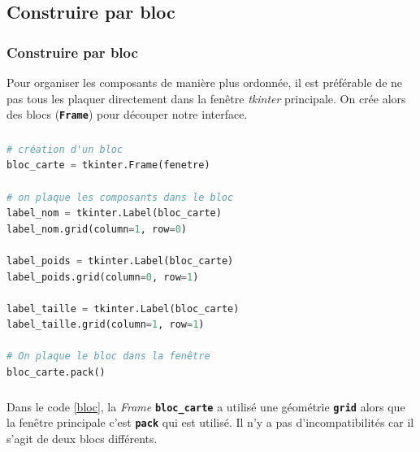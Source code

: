 \documentclass[svgnames,11pt]{beamer}
\begin{document}
\subsection{Construire par bloc}
\begin{frame}
    \frametitle{Construire par bloc}

    Pour organiser les composants de manière plus ordonnée, il est préférable de ne pas tous les plaquer directement dans la fenêtre \emph{tkinter} principale. On crée alors des blocs (\textbf{\texttt{Frame}}) pour découper notre interface.


\end{frame}
\begin{frame}[fragile]
    \frametitle{}

    \begin{center}
        \begin{lstlisting}[language=Python, basicstyle=\small]
# création d'un bloc
bloc_carte = tkinter.Frame(fenetre)

# on plaque les composants dans le bloc
label_nom = tkinter.Label(bloc_carte)
label_nom.grid(column=1, row=0)

label_poids = tkinter.Label(bloc_carte)
label_poids.grid(column=0, row=1)

label_taille = tkinter.Label(bloc_carte)
label_taille.grid(column=1, row=1)

# On plaque le bloc dans la fenêtre
bloc_carte.pack()
\end{lstlisting}
        \label{bloc}
    \end{center}

\end{frame}
\begin{frame}
    \frametitle{}

    \begin{aretenir}[Remarque]
        Dans le code \ref{bloc}, la \emph{Frame} \textbf{\texttt{bloc\_carte}} a utilisé une géométrie \textbf{\texttt{grid}} alors que la fenêtre principale c'est \textbf{\texttt{pack}} qui est utilisé. Il n'y a pas d'incompatibilités car il s'agit de deux blocs différents.
    \end{aretenir}

\end{frame}
\end{document}
